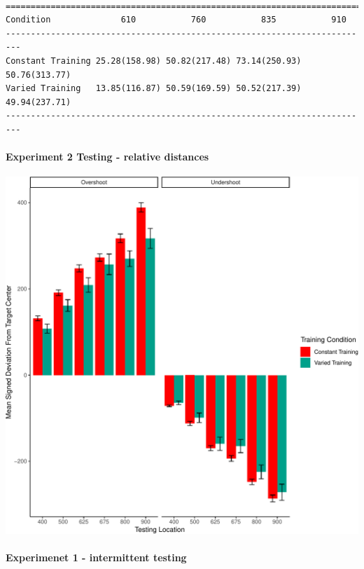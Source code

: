\documentclass[
  12pt,
  letterpaper,
]{article}
\begin{document}
\begin{verbatim}

=========================================================================
Condition              610           760           835           910     
-------------------------------------------------------------------------
Constant Training 25.28(158.98) 50.82(217.48) 73.14(250.93) 50.76(313.77)
Varied Training   13.85(116.87) 50.59(169.59) 50.52(217.39) 49.94(237.71)
-------------------------------------------------------------------------
\end{verbatim}

\paragraph{Experiment 2 Testing - relative
distances}\label{experiment-2-testing---relative-distances}

\includegraphics{full_files/figure-pdf/unnamed-chunk-66-1.pdf}

\paragraph{Experimenet 1 - intermittent
testing}\label{experimenet-1---intermittent-testing}
\end{document}
